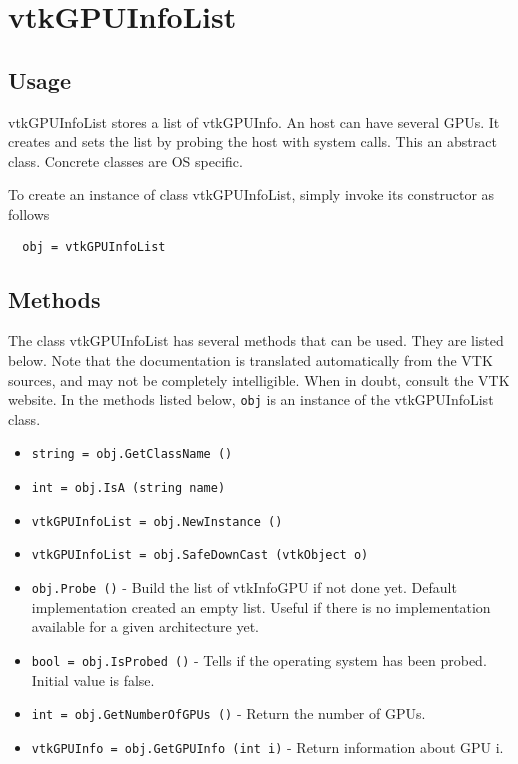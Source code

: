 \section{vtkGPUInfoList}

\subsection{Usage}

 vtkGPUInfoList stores a list of vtkGPUInfo. An host can have
 several GPUs. It creates and sets the list by probing the host with system
 calls. This an abstract class. Concrete classes are OS specific.

To create an instance of class vtkGPUInfoList, simply
invoke its constructor as follows
\begin{verbatim}
  obj = vtkGPUInfoList
\end{verbatim}
\subsection{Methods}

The class vtkGPUInfoList has several methods that can be used.
  They are listed below.
Note that the documentation is translated automatically from the VTK sources,
and may not be completely intelligible.  When in doubt, consult the VTK website.
In the methods listed below, \verb|obj| is an instance of the vtkGPUInfoList class.
\begin{itemize}
\item  \verb|string = obj.GetClassName ()|

\item  \verb|int = obj.IsA (string name)|

\item  \verb|vtkGPUInfoList = obj.NewInstance ()|

\item  \verb|vtkGPUInfoList = obj.SafeDownCast (vtkObject o)|

\item  \verb|obj.Probe ()| -  Build the list of vtkInfoGPU if not done yet.
 Default implementation created an empty list. Useful if there is no
 implementation available for a given architecture yet.
 

\item  \verb|bool = obj.IsProbed ()| -  Tells if the operating system has been probed. Initial value is false.

\item  \verb|int = obj.GetNumberOfGPUs ()| -  Return the number of GPUs.
 

\item  \verb|vtkGPUInfo = obj.GetGPUInfo (int i)| -  Return information about GPU i.
 
 
 

\end{itemize}
